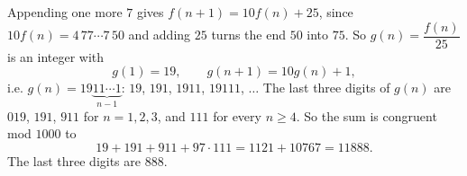 Appending one more $7$ gives $f(n+1)=10f(n)+25$, since $10f(n)=4\,77\cdots7\,50$ and adding $25$ turns the end $50$ into $75$. So $g(n)=\dfrac{f(n)}{25}$ is an integer with
\[g(1)=19,\qquad g(n+1)=10g(n)+1,\]
i.e. $g(n)=19\underbrace{11\cdots1}_{n-1}$: $19$, $191$, $1911$, $19111$, $\dots$ The last three digits of $g(n)$ are $019$, $191$, $911$ for $n=1,2,3$, and $111$ for every $n\ge4$. So the sum is congruent mod $1000$ to
\[19+191+911+97\cdot111=1121+10767=11888.\]
The last three digits are $\boxed{888}$.
